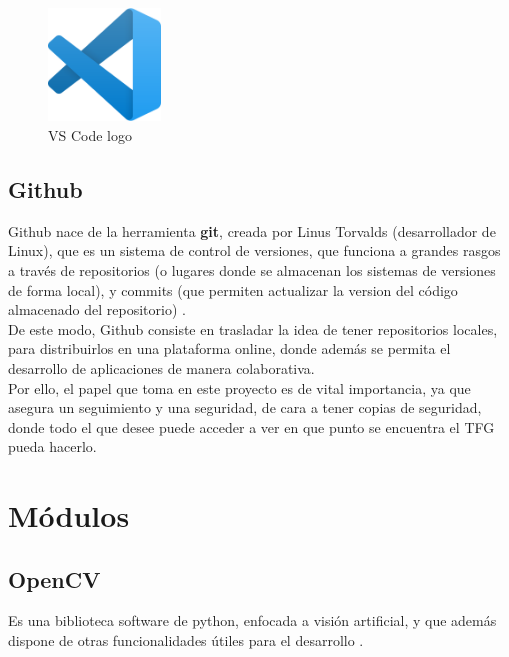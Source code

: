 \begin{figure} [H]
	\begin{center}
	\includegraphics[height=3cm]{imagenes/cap3/4_vscode_logo.png}
	\end{center}
	\caption[VS Code logo]{VS Code logo}
	\label{fig:vscode}
\end{figure}

\subsection{Github}
\label{subsec:github}

Github nace de la herramienta \textbf{git}, creada por Linus Torvalds (desarrollador de Linux), que es un sistema de control de versiones, que funciona a grandes rasgos a través de repositorios (o lugares donde se almacenan los sistemas de versiones de forma local), y commits (que permiten actualizar la version del código almacenado del repositorio) \cite{github-def}.\\

De este modo, Github consiste en trasladar la idea de tener repositorios locales, para distribuirlos en una plataforma online, donde además se permita el desarrollo de aplicaciones de manera colaborativa.\\

Por ello, el papel que toma en este proyecto es de vital importancia, ya que asegura un seguimiento y una seguridad, de cara a tener copias de seguridad, donde todo el que desee puede acceder a ver en que punto se encuentra el \ac{TFG} pueda hacerlo.\\

\section{Módulos}
\label{sec:modulos}

\subsection{OpenCV}
\label{subsec:opencv}

Es una biblioteca software de python, enfocada a visión artificial, y que además dispone de otras funcionalidades útiles para el desarrollo \cite{opencv-def}.\\

